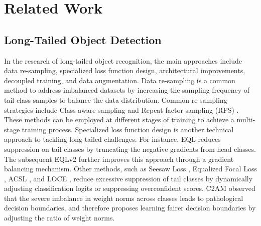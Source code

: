 \section{Related Work}
\vspace{-3mm}

\subsection{Long-Tailed Object Detection}
\label{sec2.1}
\vspace{-3mm}

In the research of long-tailed object recognition, the main approaches include data re-sampling, specialized loss function design, architectural improvements, decoupled training, and data augmentation.
Data re-sampling is a common method to address imbalanced datasets by increasing the sampling frequency of tail class samples to balance the data distribution. Common re-sampling strategies include Class-aware sampling \cite{Class_aware_sampling} and Repeat factor sampling (RFS) \cite{lvis}. These methods can be employed at different stages of training to achieve a multi-stage training process. Specialized loss function design is another technical approach to tackling long-tailed challenges. For instance, EQL \cite{eql} reduces suppression on tail classes by truncating the negative gradients from head classes. The subsequent EQLv2 \cite{eqlv2} further improves this approach through a gradient balancing mechanism. Other methods, such as Seesaw Loss \cite{seesaw}, Equalized Focal Loss \cite{efl}, ACSL \cite{acsl}, and LOCE \cite{loce}, reduce excessive suppression of tail classes by dynamically adjusting classification logits or suppressing overconfident scores. C2AM \cite{c2am} observed that the severe imbalance in weight norms across classes leads to pathological decision boundaries, and therefore proposes learning fairer decision boundaries by adjusting the ratio of weight norms. 

